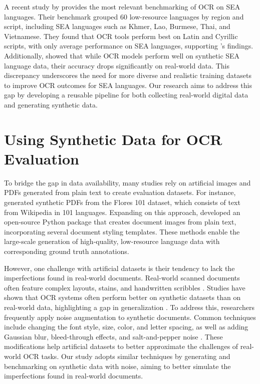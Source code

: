 \documentclass[12pt,oneside]{memoir}
\begin{document}
A recent study by \textcite{ignat-etal-2022} provides the most relevant benchmarking of OCR on SEA languages.
Their benchmark grouped 60 low-resource languages by region and script, including SEA languages such as Khmer, Lao, Burmese, Thai, and Vietnamese.
They found that OCR tools perform best on Latin and Cyrillic scripts, with only average performance on SEA languages, supporting \textcite{hegghammer-2022}'s findings.
Additionally, \textcite{ignat-etal-2022} showed that while OCR models perform well on synthetic SEA language data, their accuracy drops significantly on real-world data.
This discrepancy underscores the need for more diverse and realistic training datasets to improve OCR outcomes for SEA languages.
Our research aims to address this gap by developing a reusable pipeline for both collecting real-world digital data and generating synthetic data.

\section{Using Synthetic Data for OCR Evaluation}

To bridge the gap in data availability, many studies rely on artificial images and PDFs generated from plain text to create evaluation datasets.
For instance, \textcite{ignat-etal-2022} generated synthetic PDFs from the Flores 101 dataset, which consists of text from Wikipedia in 101 languages.
Expanding on this approach, \textcite{gupte-etal-2021} developed an open-source Python package that creates document images from plain text, incorporating several document styling templates.
These methods enable the large-scale generation of high-quality, low-resource language data with corresponding ground truth annotations.

However, one challenge with artificial datasets is their tendency to lack the imperfections found in real-world documents. 
Real-world scanned documents often feature complex layouts, stains, and handwritten scribbles \parencite{hegghammer-2022}. 
Studies have shown that OCR systems often perform better on synthetic datasets than on real-world data, highlighting a gap in generalization \parencite{ignat-etal-2022}.
To address this, researchers frequently apply noise augmentation to synthetic documents. 
Common techniques include changing the font style, size, color, and letter spacing, as well as adding Gaussian blur, bleed-through effects, and salt-and-pepper noise \parencite{gupte-etal-2021, ignat-etal-2022}.
These modifications help artificial datasets to better approximate the challenges of real-world OCR tasks.
Our study adopts similar techniques by generating and benchmarking on synthetic data with noise, aiming to better simulate the imperfections found in real-world documents.
\end{document}
